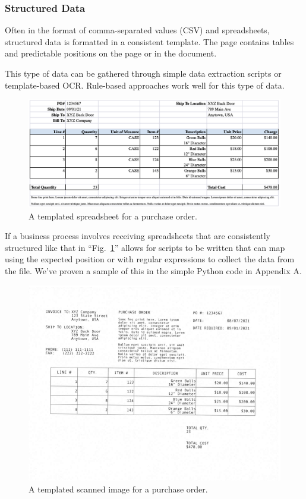 \documentclass[conference]{IEEEtran}
\begin{document}
\subsubsection{Structured Data}
Often in the format of comma-separated values (CSV) and spreadsheets, structured data is formatted in a consistent template. The page contains tables and predictable positions on the page or in the document.

This type of data can be gathered through simple data extraction scripts or template-based OCR. Rule-based approaches work well for this type of data.

\begin{figure}[ht]
\centerline{\includegraphics[width=\columnwidth]{Spreadsheet1.png}}
\caption{A templated spreadsheet for a purchase order.}
\label{figSpreadsheet1}
\end{figure}

If a business process involves receiving spreadsheets that are consistently structured like that in ``Fig.~\ref{figSpreadsheet1}'' allows for scripts to be written that can map using the expected position or with regular expressions to collect the data from the file. We've proven a sample of this in the simple Python code in Appendix A.

\begin{figure}[ht]
\centerline{\includegraphics[width=\columnwidth]{ORDER_1_scanned.png}}
\caption{A templated scanned image for a purchase order.}
\label{figScanned1}
\end{figure}
\end{document}
